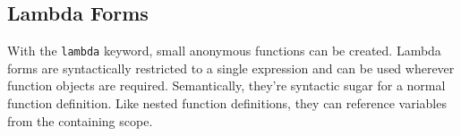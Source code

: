 \subsection{Lambda Forms}

With the \verb=lambda= keyword, small anonymous functions can be created.
Lambda forms are syntactically restricted to a single expression
and can be used wherever function objects are required.
Semantically, they're syntactic sugar for a normal function definition.
Like nested function definitions,
they can reference variables from the containing scope.
